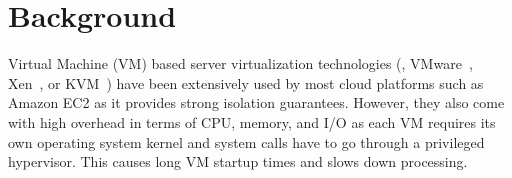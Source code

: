 \section{Background}
\label{sec:background}



Virtual Machine (VM) based server virtualization technologies (\eg, VMware~\cite{vmware},
Xen~\cite{xen}, or KVM~\cite{kvm}) have been extensively used by most cloud
platforms such as Amazon EC2 as it provides strong isolation guarantees.
%
%
However, they also come with high overhead in terms of CPU, memory, and I/O as
each VM requires its own operating system kernel and system calls have to go
through a privileged hypervisor. This causes long VM startup times and slows down
processing.
%
%

